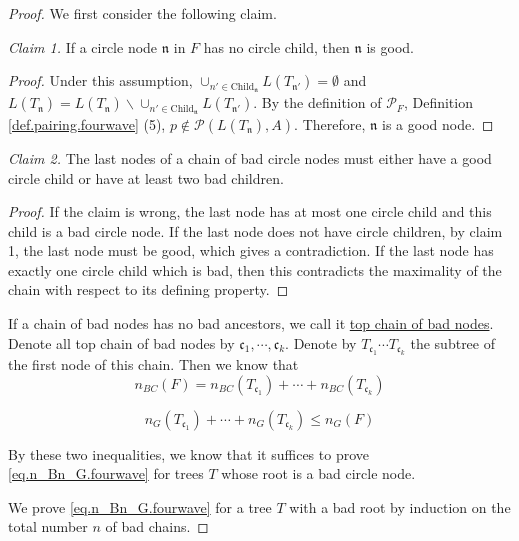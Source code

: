 \begin{proof} We first consider the following claim.
 
\textit{Claim 1.} If a circle node $\mathfrak{n}$ in $F$ has no circle child, then $\mathfrak{n}$ is good.

\begin{proof}
 Under this assumption, $\cup_{n'\in \text{Child}_{\mathfrak{n}}} L(T_{\mathfrak{n}'}) = \emptyset$ and $L(T_{\mathfrak{n}}) = L(T_{\mathfrak{n}})\backslash\cup_{n'\in \text{Child}_{\mathfrak{n}}} L(T_{\mathfrak{n}'})$. By the definition of $\mathcal{P}_F$, Definition \ref{def.pairing.fourwave} (5), $p\notin\mathcal{P}(L(T_{\mathfrak{n}}), A)$. Therefore, $\mathfrak{n}$ is a good node.
\end{proof}


\textit{Claim 2.} The last nodes of a chain of bad circle nodes must either have a good circle child or have at least two bad children.

\begin{proof}
 If the claim is wrong, the last node has at most one circle child and this child is a bad circle node. If the last node does not have circle children, by claim 1, the last node must be good, which gives a contradiction. If the last node has exactly one circle child which is bad, then this contradicts the maximality of the chain with respect to its defining property.
\end{proof}


If a chain of bad nodes has no bad ancestors, we call it \underline{top chain of bad nodes}. Denote all top chain of bad nodes by $\mathfrak{c}_1, \cdots, \mathfrak{c}_k$. Denote by $T_{\mathfrak{c}_1}\cdots T_{\mathfrak{c}_k}$ the subtree of the first node of this chain. Then we know that 
\begin{equation}
 n_{BC}(F) = n_{BC}(T_{\mathfrak{c}_1}) + \cdots + n_{BC}(T_{\mathfrak{c}_k})
\end{equation}

\begin{equation}
 n_{G}(T_{\mathfrak{c}_1}) + \cdots + n_{G}(T_{\mathfrak{c}_k})\le n_{G}(F)
\end{equation}

By these two inequalities, we know that it suffices to prove \eqref{eq.n_Bn_G.fourwave} for trees $T$ whose root is a bad circle node.

We prove \eqref{eq.n_Bn_G.fourwave} for a tree $T$ with a bad root by induction on the total number $n$ of bad chains. 


\end{proof}
